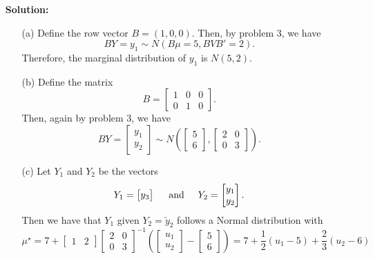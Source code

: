 \documentclass[11pt]{article}
\begin{document}
\begin{itemize}
\item[] {\bf Solution:}
\begin{itemize}
\item[(a)] Define the row vector $B=(1,0,0)$.  Then, by problem 3, we have
\[
BY = y_1 \sim N(B\mu = 5, BVB' = 2).
\]
Therefore, the marginal distribution of $y_1$ is $N(5,2)$.
\end{itemize}
\begin{itemize}
\item[(b)]  Define the matrix
\[
B=\begin{bmatrix}
1 & 0 & 0 \\
0 & 1 & 0
\end{bmatrix}.
\]
Then, again by problem 3, we have
\[
BY = \begin{bmatrix}
y_1\\y_2
\end{bmatrix} \sim N\left(\begin{bmatrix}
5 \\ 6
\end{bmatrix}, \begin{bmatrix}
2 & 0 \\ 0 & 3
\end{bmatrix}\right).
\]
\end{itemize}
\begin{itemize}
\item[(c)]  Let $Y_1$ and $Y_2$ be the vectors
\[
Y_1 = \begin{bmatrix}
y_3
\end{bmatrix} \hspace{5mm}\text{and}\hspace{5mm} Y_2 = \begin{bmatrix}
y_1 \\ y_2
\end{bmatrix}.
\]
Then we have that $Y_1$ given $Y_2 = \utilde{y}_2$ follows a Normal distribution with
\[
\mu^\star = 7 + \begin{bmatrix}
1 & 2
\end{bmatrix} \begin{bmatrix}
2 & 0 \\
0 & 3
\end{bmatrix}^{-1} \left(\begin{bmatrix}
u_1 \\ u_2
\end{bmatrix} - \begin{bmatrix}
5 \\ 6
\end{bmatrix}\right) = 7 + \frac{1}{2}(u_1 - 5) + \frac{2}{3}(u_2 - 6)
\]
\end{itemize}
\end{itemize}
\end{document}
